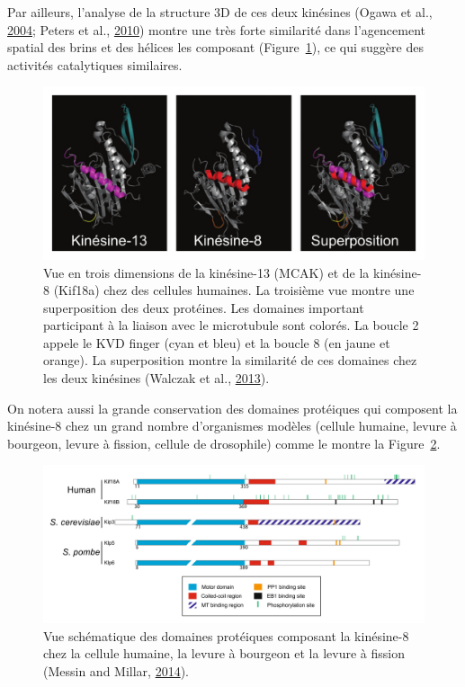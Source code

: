 \documentclass[12pt,a4paper,twoside,openright]{book}
\begin{document}
Par ailleurs, l'analyse de la structure 3D de ces deux kinésines (Ogawa
et al., \protect\hyperlink{ref-Ogawa2004}{2004}; Peters et al.,
\protect\hyperlink{ref-Peters2010}{2010}) montre une très forte
similarité dans l'agencement spatial des brins et des hélices les
composant (Figure~\ref{fig:dep_kinesin}), ce qui suggère des activités
catalytiques similaires.

\begin{figure}[htbp]
\centering
\includegraphics{figures/intro/dep_kinesin.png}
\caption[Reconstruction 3D des kinésines dépolymérisatrice]{\label{fig:dep_kinesin}Vue
en trois dimensions de la kinésine-13 (MCAK) et de la kinésine-8
(Kif18a) chez des cellules humaines. La troisième vue montre une
superposition des deux protéines. Les domaines important participant à
la liaison avec le microtubule sont colorés. La boucle 2 appele le KVD
finger (cyan et bleu) et la boucle 8 (en jaune et orange). La
superposition montre la similarité de ces domaines chez les deux
kinésines (Walczak et al., \protect\hyperlink{ref-Walczak2013a}{2013}).}
\end{figure}

On notera aussi la grande conservation des domaines protéiques qui
composent la kinésine-8 chez un grand nombre d'organismes modèles
(cellule humaine, levure à bourgeon, levure à fission, cellule de
drosophile) comme le montre la Figure~\ref{fig:proteicdomain}.

\begin{figure}[htbp]
\centering
\includegraphics{figures/intro/proteicdomain.png}
\caption[Les domaines protéiques des différentes kinésine-8]{\label{fig:proteicdomain}Vue
schématique des domaines protéiques composant la kinésine-8 chez la
cellule humaine, la levure à bourgeon et la levure à fission (Messin and
Millar, \protect\hyperlink{ref-Messin2014}{2014}).}
\end{figure}
\end{document}
